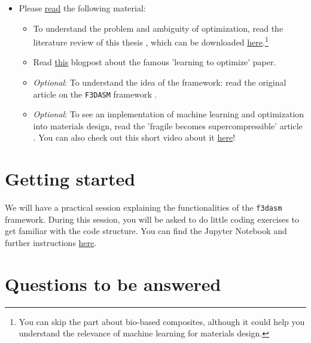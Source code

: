 \documentclass[10pt,a4paper,twoside]{article} %
\def\code#1{\texttt{#1}}
\begin{document}
\begin{itemize}
	\item Please \underline{read} the following material:
	
	\begin{itemize}
		
		\item To understand the problem and ambiguity of optimization, read the literature review of this thesis \cite{Schelling2021}, which can be downloaded \href{https://repository.tudelft.nl/islandora/object/uuid\%3Ad58271d6-21bb-470c-a5ee-4584b3b8ee29?collection=education}{here}.\footnote{You can skip the part about bio-based composites, although it could help you understand the relevance of machine learning for materials design.}
		
		\item Read \href{https://bair.berkeley.edu/blog/2017/09/12/learning-to-optimize-with-rl/}{this} blogpost about the famous 'learning to optimize' paper.
		\
		\item \textit{Optional}: To understand the idea of the framework: read the original article on the \code{F3DASM} framework \cite{Bessa2017}.
		
		\item \textit{Optional}: To see an implementation of machine learning and optimization into materials design, read the 'fragile becomes supercompressible' article \cite{Bessa2019}. You can also check out this short video about it \href{https://www.youtube.com/watch?v=cWTWHhMAu7I}{here}!
		
	\end{itemize}
	
\end{itemize}

\section*{Getting started}

We will have a practical session explaining the functionalities of the \code{f3dasm} framework. During this session, you will be asked to do little coding exercises to get familiar with the code structure. You can find the Jupyter Notebook and further instructions \href{https://github.com/mpvanderschelling/F3DASM_practical}{here}.

\vspace{5mm}

\section*{Questions to be answered}
\end{document}
